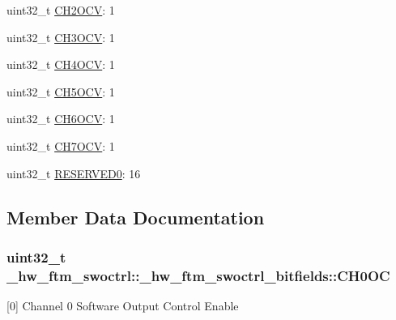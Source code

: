 \begin{DoxyCompactItemize}
\item 
uint32\+\_\+t \hyperlink{struct__hw__ftm__swoctrl_1_1__hw__ftm__swoctrl__bitfields_a7384df9d78a843e94ef577d6e61d271a}{C\+H2\+O\+CV}\+: 1
\item 
uint32\+\_\+t \hyperlink{struct__hw__ftm__swoctrl_1_1__hw__ftm__swoctrl__bitfields_a16d4e15f3824fd9cfdc4585dc0af09eb}{C\+H3\+O\+CV}\+: 1
\item 
uint32\+\_\+t \hyperlink{struct__hw__ftm__swoctrl_1_1__hw__ftm__swoctrl__bitfields_a639c7b3aec1415e668a74b7175a754d1}{C\+H4\+O\+CV}\+: 1
\item 
uint32\+\_\+t \hyperlink{struct__hw__ftm__swoctrl_1_1__hw__ftm__swoctrl__bitfields_a71c22f6d6c74c05ad84ba6b99eb5d462}{C\+H5\+O\+CV}\+: 1
\item 
uint32\+\_\+t \hyperlink{struct__hw__ftm__swoctrl_1_1__hw__ftm__swoctrl__bitfields_a2f5eba942634d50797fd4c18c3d436eb}{C\+H6\+O\+CV}\+: 1
\item 
uint32\+\_\+t \hyperlink{struct__hw__ftm__swoctrl_1_1__hw__ftm__swoctrl__bitfields_ade955ce0b80b0f2bd29da65f314bb0de}{C\+H7\+O\+CV}\+: 1
\item 
uint32\+\_\+t \hyperlink{struct__hw__ftm__swoctrl_1_1__hw__ftm__swoctrl__bitfields_abf73719eb7220c12d341180b63208b83}{R\+E\+S\+E\+R\+V\+E\+D0}\+: 16
\end{DoxyCompactItemize}


\subsection{Member Data Documentation}
\subsubsection[{\texorpdfstring{C\+H0\+OC}{CH0OC}}]{\setlength{\rightskip}{0pt plus 5cm}uint32\+\_\+t \+\_\+hw\+\_\+ftm\+\_\+swoctrl\+::\+\_\+hw\+\_\+ftm\+\_\+swoctrl\+\_\+bitfields\+::\+C\+H0\+OC}\hypertarget{struct__hw__ftm__swoctrl_1_1__hw__ftm__swoctrl__bitfields_a21dcc7e0e04f439b86f65c746ed730da}{}\label{struct__hw__ftm__swoctrl_1_1__hw__ftm__swoctrl__bitfields_a21dcc7e0e04f439b86f65c746ed730da}
\mbox{[}0\mbox{]} Channel 0 Software Output Control Enable 
